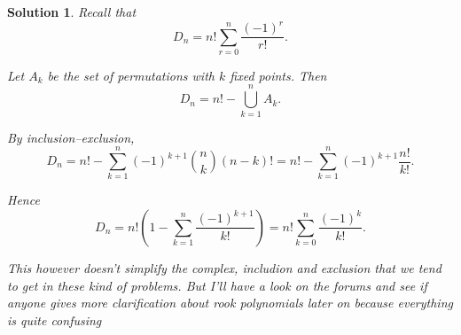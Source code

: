 \documentclass[11pt, leqno]{article}
\theoremstyle{definition}
\theoremstyle{plain}
\newtheorem*{solution}{Solution}
\begin{document}
\begin{solution}


Recall that
\[
D_n = n!\sum_{r=0}^{n}\frac{(-1)^r}{r!}.
\]

Let \(A_k\) be the set of permutations with \(k\) fixed points. Then
\[
D_n = n! - \bigcup_{k=1}^n A_k.
\]

By inclusion--exclusion,
\[
D_n
= n! - \sum_{k=1}^n (-1)^{k+1} \binom{n}{k}(n-k)!
= n! - \sum_{k=1}^n (-1)^{k+1} \frac{n!}{k!}.
\]

Hence
\[
D_n
= n!\left(1 - \sum_{k=1}^n \frac{(-1)^{k+1}}{k!}\right)
= n!\sum_{k=0}^n \frac{(-1)^k}{k!}.
\]

This however doesn't simplify the complex, includion and exclusion that we tend to get in these kind of problems. But I'll have a look on the forums and see if anyone gives more clarification about rook polynomials later on because everything is quite confusing








\end{solution}
\end{document}
